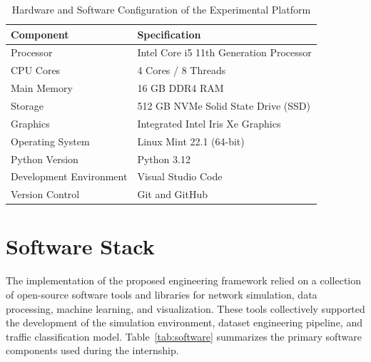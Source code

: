 \documentclass[12pt,a4paper]{report}
\begin{document}
	\begin{table}[H]
		\centering
		\caption{Hardware and Software Configuration of the Experimental Platform}
		\label{tab:hardware}
		
		\begin{tabular}{|p{5cm}|p{8cm}|}
			\hline
			
			\textbf{Component} &
			\textbf{Specification}
			\\
			\hline
			
			Processor &
			Intel Core i5 11th Generation Processor
			\\
			\hline
			
			CPU Cores &
			4 Cores / 8 Threads
			\\
			\hline
			
			Main Memory &
			16 GB DDR4 RAM
			\\
			\hline
			
			Storage &
			512 GB NVMe Solid State Drive (SSD)
			\\
			\hline
			
			Graphics &
			Integrated Intel Iris Xe Graphics
			\\
			\hline
			
			Operating System &
			Linux Mint 22.1 (64-bit)
			\\
			\hline
			
			Python Version &
			Python 3.12
			\\
			\hline
			
			Development Environment &
			Visual Studio Code
			\\
			\hline
			
			Version Control &
			Git and GitHub
			\\
			\hline
			
		\end{tabular}
		
	\end{table}
	
	
\section{Software Stack}
\label{sec:software_stack}

The implementation of the proposed engineering framework relied on a collection of open-source software tools and libraries for network simulation, data processing, machine learning, and visualization. These tools collectively supported the development of the simulation environment, dataset engineering pipeline, and traffic classification model. Table~\ref{tab:software} summarizes the primary software components used during the internship.
\end{document}
